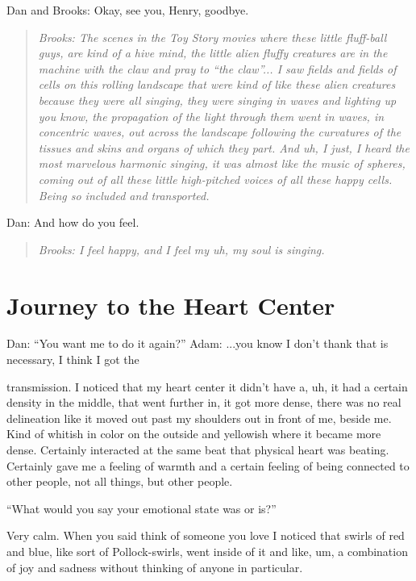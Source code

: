 \documentclass[12pt]{book}
\begin{document}
Dan and Brooks: Okay,  see you, Henry, goodbye.


\begin{quote}{\em
Brooks:  The scenes in the Toy Story movies where these
little fluff-ball guys, are kind of a hive mind,
the little alien fluffy creatures are in the machine
with the claw and pray to ``the claw''...
I saw fields and fields of cells on this rolling landscape
that were kind of like these alien creatures because they
were all singing, they were singing in waves and lighting up
you know, the propagation of the light through them went
in waves, in concentric waves, out across the landscape
following the curvatures of the tissues and skins and organs
of which they part. And uh, I just,  I heard the most marvelous harmonic
singing, it was almost like the music of spheres,
coming out of all these little high-pitched voices 
of all these happy cells.
Being so included and transported.
}\end{quote}

Dan: And how do you feel.

\begin{quote}{\em
Brooks: I feel happy, and I feel my uh, my soul is singing.
}\end{quote}    

\section{Journey to the Heart Center}

Dan: “You want me to do it again?”
Adam: ...you know I don’t thank that is necessary, I think I got the
					
transmission. I noticed that my heart center it didn’t have a, uh, it had a certain density in the middle, that went further in, it got more dense, there was no real delineation like it moved out past my shoulders out in front of me, beside me. Kind of whitish in color on the outside and yellowish where it became more dense. Certainly interacted at the same beat that physical heart was beating. Certainly gave me a feeling of warmth and a certain feeling of being connected to other people, not all things, but other people.
					
“What would you say your emotional state was or is?”
					
Very calm. When you said think of someone you love I noticed that swirls of red and blue, like sort of Pollock-swirls, went inside of it and like, um, a combination of joy and sadness without thinking of anyone in particular.
					
\end{document}
